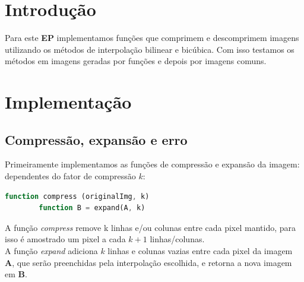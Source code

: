\documentclass[12pt, a4paper]{article}
\begin{document}
\section*{Introdução}
    Para este \textbf{EP} implementamos funções que comprimem e descomprimem imagens
    utilizando os métodos de interpolação bilinear e bicúbica. Com isso testamos
    os métodos em imagens geradas por funções e depois por imagens comuns.

\section*{Implementação}
\subsection*{Compressão, expansão e erro}
    Primeiramente implementamos as funções de compressão e expansão da imagem:
    dependentes do fator de compressão $k$:
    \begin{lstlisting}[language=Octave]
        function compress (originalImg, k)
        function B = expand(A, k)
    \end{lstlisting}
    A função \emph{compress} remove k linhas e/ou colunas entre cada pixel mantido,
    para isso é amostrado um pixel a cada $k+1$ linhas/colunas.\\
    A função \emph{expand} adiciona $k$ linhas e colunas vazias entre cada pixel
    da imagem \textbf{A}, que serão preenchidas pela interpolação escolhida, e
    retorna a nova imagem em \textbf{B}.\\
\end{document}
